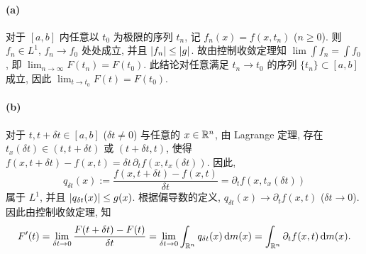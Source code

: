 \documentclass{article}
\begin{document}
\begin{solution}
	\paragraph{(a)} 对于 $[a, b]$ 内任意以 $t_0$ 为极限的序列 $t_n$, 记 $f_n(x) = f(x, t_n)$ ($n \ge 0$). 则 $f_n \in L^1$, $f_n \to f_0$ 处处成立, 并且 $\left|f_n\right| \le \left|g\right|$. 故由控制收敛定理知 $\lim \int f_n = \int f_0$, 即 $\lim_{n \to \infty} F(t_n) = F(t_0)$. 此结论对任意满足 $t_n \to t_0$ 的序列 $\{t_n\} \subset [a, b]$ 成立, 因此 $\lim_{t \to t_0} F(t) = F(t_0)$.

	\paragraph{(b)} 对于 $t, t + \delta t \in [a, b]$ ($\delta t \neq 0$) 与任意的 $x \in \mathbb{R}^n$, 由 Lagrange 定理, 存在 $t_{x}(\delta t) \in (t, t + \delta t)$ 或 $(t + \delta t, t)$, 使得 $f(x, t+\delta t) - f(x, t) = \delta t \, \partial_t f(x, t_{x}(\delta t))$. 因此,
	\[ q_{\delta t}(x) := \frac{f(x, t+\delta t) - f(x, t)}{\delta t} = \partial_t f(x, t_x(\delta t)) \]
	属于 $L^1$, 并且 $\left|q_{\delta t}(x)\right| \le g(x)$. 根据偏导数的定义, $q_{\delta t}(x) \to \partial_t f(x,t)$ ($\delta t \to 0$). 因此由控制收敛定理, 知
	\[ F'(t) = \lim_{\delta t \to 0} \frac{F(t+\delta t) - F(t)}{\delta t} = \lim_{\delta t \to 0} \int_{\mathbb{R}^n} q_{\delta t}(x) \,\mathrm{d} m(x) = \int_{\mathbb{R}^n} \partial_t f(x,t) \,\mathrm{d} m(x). \]
\end{solution}
\end{document}
